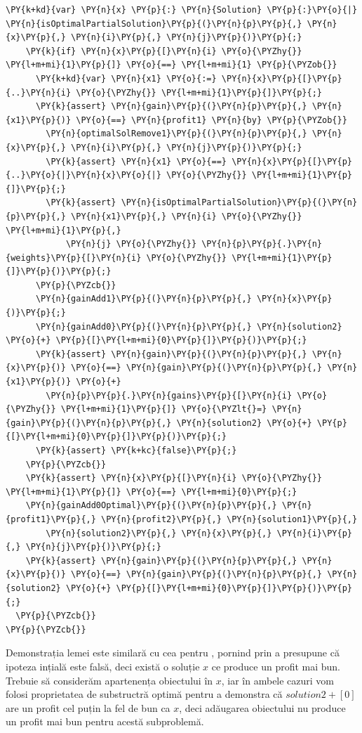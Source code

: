 \begin{sloppypar}
\begin{enumerate}
\begin{Verbatim}[commandchars=\\\{\}]
    \PY{k+kd}{var} \PY{n}{x} \PY{p}{:} \PY{n}{Solution} \PY{p}{:}\PY{o}{|} \PY{n}{isOptimalPartialSolution}\PY{p}{(}\PY{n}{p}\PY{p}{,} \PY{n}{x}\PY{p}{,} \PY{n}{i}\PY{p}{,} \PY{n}{j}\PY{p}{)}\PY{p}{;}
    \PY{k}{if} \PY{n}{x}\PY{p}{[}\PY{n}{i} \PY{o}{\PYZhy{}} \PY{l+m+mi}{1}\PY{p}{]} \PY{o}{==} \PY{l+m+mi}{1} \PY{p}{\PYZob{}}
      \PY{k+kd}{var} \PY{n}{x1} \PY{o}{:=} \PY{n}{x}\PY{p}{[}\PY{p}{..}\PY{n}{i} \PY{o}{\PYZhy{}} \PY{l+m+mi}{1}\PY{p}{]}\PY{p}{;}
      \PY{k}{assert} \PY{n}{gain}\PY{p}{(}\PY{n}{p}\PY{p}{,} \PY{n}{x1}\PY{p}{)} \PY{o}{==} \PY{n}{profit1} \PY{n}{by} \PY{p}{\PYZob{}}
        \PY{n}{optimalSolRemove1}\PY{p}{(}\PY{n}{p}\PY{p}{,} \PY{n}{x}\PY{p}{,} \PY{n}{i}\PY{p}{,} \PY{n}{j}\PY{p}{)}\PY{p}{;}
        \PY{k}{assert} \PY{n}{x1} \PY{o}{==} \PY{n}{x}\PY{p}{[}\PY{p}{..}\PY{o}{|}\PY{n}{x}\PY{o}{|} \PY{o}{\PYZhy{}} \PY{l+m+mi}{1}\PY{p}{]}\PY{p}{;}
        \PY{k}{assert} \PY{n}{isOptimalPartialSolution}\PY{p}{(}\PY{n}{p}\PY{p}{,} \PY{n}{x1}\PY{p}{,} \PY{n}{i} \PY{o}{\PYZhy{}} \PY{l+m+mi}{1}\PY{p}{,} 
            \PY{n}{j} \PY{o}{\PYZhy{}} \PY{n}{p}\PY{p}{.}\PY{n}{weights}\PY{p}{[}\PY{n}{i} \PY{o}{\PYZhy{}} \PY{l+m+mi}{1}\PY{p}{]}\PY{p}{)}\PY{p}{;}
      \PY{p}{\PYZcb{}}
      \PY{n}{gainAdd1}\PY{p}{(}\PY{n}{p}\PY{p}{,} \PY{n}{x}\PY{p}{)}\PY{p}{;}
      \PY{n}{gainAdd0}\PY{p}{(}\PY{n}{p}\PY{p}{,} \PY{n}{solution2} \PY{o}{+} \PY{p}{[}\PY{l+m+mi}{0}\PY{p}{]}\PY{p}{)}\PY{p}{;}
      \PY{k}{assert} \PY{n}{gain}\PY{p}{(}\PY{n}{p}\PY{p}{,} \PY{n}{x}\PY{p}{)} \PY{o}{==} \PY{n}{gain}\PY{p}{(}\PY{n}{p}\PY{p}{,} \PY{n}{x1}\PY{p}{)} \PY{o}{+} 
        \PY{n}{p}\PY{p}{.}\PY{n}{gains}\PY{p}{[}\PY{n}{i} \PY{o}{\PYZhy{}} \PY{l+m+mi}{1}\PY{p}{]} \PY{o}{\PYZlt{}=} \PY{n}{gain}\PY{p}{(}\PY{n}{p}\PY{p}{,} \PY{n}{solution2} \PY{o}{+} \PY{p}{[}\PY{l+m+mi}{0}\PY{p}{]}\PY{p}{)}\PY{p}{;}
      \PY{k}{assert} \PY{k+kc}{false}\PY{p}{;}
    \PY{p}{\PYZcb{}}
    \PY{k}{assert} \PY{n}{x}\PY{p}{[}\PY{n}{i} \PY{o}{\PYZhy{}} \PY{l+m+mi}{1}\PY{p}{]} \PY{o}{==} \PY{l+m+mi}{0}\PY{p}{;}
    \PY{n}{gainAdd0Optimal}\PY{p}{(}\PY{n}{p}\PY{p}{,} \PY{n}{profit1}\PY{p}{,} \PY{n}{profit2}\PY{p}{,} \PY{n}{solution1}\PY{p}{,} 
        \PY{n}{solution2}\PY{p}{,} \PY{n}{x}\PY{p}{,} \PY{n}{i}\PY{p}{,} \PY{n}{j}\PY{p}{)}\PY{p}{;}
    \PY{k}{assert} \PY{n}{gain}\PY{p}{(}\PY{n}{p}\PY{p}{,} \PY{n}{x}\PY{p}{)} \PY{o}{==} \PY{n}{gain}\PY{p}{(}\PY{n}{p}\PY{p}{,} \PY{n}{solution2} \PY{o}{+} \PY{p}{[}\PY{l+m+mi}{0}\PY{p}{]}\PY{p}{)}\PY{p}{;}
  \PY{p}{\PYZcb{}}
\PY{p}{\PYZcb{}}
\end{Verbatim}
     Demonstrația lemei este similară cu cea pentru , pornind prin a presupune că ipoteza ințială este falsă, deci există o soluție $x$ ce produce un profit mai bun. Trebuie să considerăm apartenența obiectului în $x$, iar în ambele cazuri vom folosi proprietatea de substructră optimă pentru a demonstra că $solution2 + [0]$ are un profit cel puțin la fel de bun ca $x$, deci adăugarea obiectului nu produce un profit mai bun pentru acestă subproblemă.

\end{enumerate}
\end{sloppypar}
